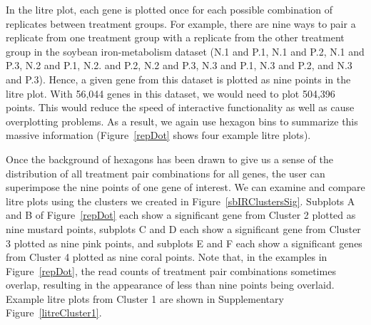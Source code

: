 \documentclass[11pt,a4paper,oldfontcommands,openany]{memoir}
\numberwithin{equation}{section} %
\begin{document}
In the litre plot, each gene is plotted once for each possible combination of replicates between treatment groups. For example, there are nine ways to pair a replicate from one treatment group with a replicate from the other treatment group in the soybean iron-metabolism dataset (N.1 and P.1, N.1 and P.2, N.1 and P.3, N.2 and P.1, N.2. and P.2, N.2 and P.3, N.3 and P.1, N.3 and P.2, and N.3 and P.3). Hence, a given gene from this dataset is plotted as nine points in the litre plot. With 56,044 genes in this dataset, we would need to plot 504,396 points. This would reduce the speed of interactive functionality as well as cause overplotting problems. As a result, we again use hexagon bins to summarize this massive information (Figure~\ref{repDot} shows four example litre plots).

Once the background of hexagons has been drawn to give us a sense of the distribution of all treatment pair combinations for all genes, the user can superimpose the nine points of one gene of interest. We can examine and compare litre plots using the clusters we created in Figure~\ref{sbIRClustersSig}. Subplots A and B of Figure~\ref{repDot} each show a significant gene from Cluster 2 plotted as nine mustard points, subplots C and D each show a significant gene from Cluster 3 plotted as nine pink points, and subplots E and F each show a significant genes from Cluster 4 plotted as nine coral points. Note that, in the examples in Figure~\ref{repDot}, the read counts of treatment pair combinations sometimes overlap, resulting in the appearance of less than nine points being overlaid. Example litre plots from Cluster 1 are shown in Supplementary Figure~\ref{litreCluster1}.
\end{document}
